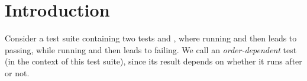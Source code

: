 \section{Introduction}


Consider a test suite containing two tests 
and , where running  and then  leads
to  passing, while running  and then
 leads to  failing. We call 
an \textit{order-dependent} test (in the context of this test suite), since its result depends on
whether it runs after  or not.



